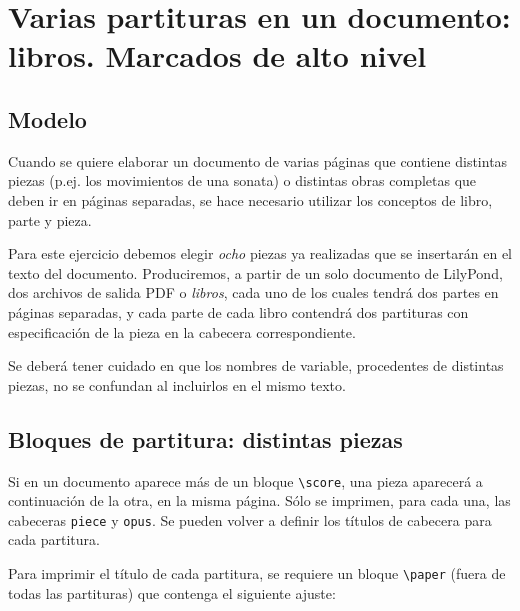 \section{Varias partituras en un documento: libros.  Marcados de alto nivel}


\subsection{Modelo}

Cuando se quiere elaborar un documento de varias páginas que contiene
distintas piezas (p.ej. los movimientos de una sonata) o distintas
obras completas que deben ir en páginas separadas, se hace necesario
utilizar los conceptos de libro, parte y pieza.

Para este ejercicio debemos elegir \emph{ocho} piezas ya realizadas
que se insertarán en el texto del documento.  Produciremos, a partir
de un solo documento de LilyPond, dos archivos de salida PDF o
\emph{libros}, cada uno de los cuales tendrá dos partes en páginas
separadas, y cada parte de cada libro contendrá dos partituras con
especificación de la pieza en la cabecera correspondiente.

\bigskip
\parindent=0mm
\parindent=6mm
\bigskip

Se deberá tener cuidado en que los nombres de variable,
procedentes de distintas piezas, no se confundan al incluirlos en
el mismo texto.


\subsection{Bloques de partitura: distintas piezas}

Si en un documento aparece más de un bloque \verb+\score+, una pieza
aparecerá a continuación de la otra, en la misma página. Sólo se
imprimen, para cada una, las cabeceras \verb+piece+ y \verb+opus+.  Se
pueden volver a definir los títulos de cabecera para cada partitura.

Para imprimir el título de cada partitura, se requiere un bloque
\verb+\paper+ (fuera de todas las partituras) que contenga el
siguiente ajuste:

